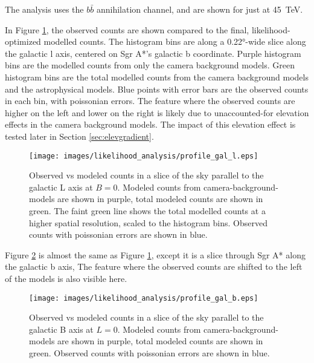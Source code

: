   The analysis uses the $b\bar{b}$ annihilation channel, and are shown for just at \SI{45}{TeV}.

  In Figure \ref{fig:gc_profile_gal_l}, the observed counts are shown compared to the final, likelihood-optimized modelled counts.
  The histogram bins are along a \ang{0.22}-wide slice along the galactic l axis, centered on Sgr A*'s galactic b coordinate.
  Purple histogram bins are the modelled counts from only the camera background models.
  Green histogram bins are the total modelled counts from the camera background models and the astrophysical models.
  Blue points with error bars are the observed counts in each bin, with poissonian errors.
  The feature where the observed counts are higher on the left and lower on the right is likely due to unaccounted-for elevation effects in the camera background models.
  The impact of this elevation effect is tested later in Section \ref{sec:elevgradient}.
  
  \begin{figure}[h]
    \centering
    \texttt{[image: images/likelihood\_analysis/profile\_gal\_l.eps]}
    \caption[Galactic Center Profile vs Galactic L]{
      Observed vs modeled counts in a slice of the sky parallel to the galactic L axis at $B=0$.
      Modeled counts from camera-background-models are shown in purple, total modeled counts are shown in green.
      The faint green line shows the total modelled counts at a higher spatial resolution, scaled to the histogram bins.
      Observed counts with poissonian errors are shown in blue.
    }
    \label{fig:gc_profile_gal_l}
  \end{figure}

  Figure \ref{fig:gc_profile_gal_b} is almost the same as Figure \ref{fig:gc_profile_gal_l}, except it is a slice through Sgr A* along the galactic b axis,
  The feature where the observed counts are shifted to the left of the models is also visible here.

  \begin{figure}[h]
    \centering
    \texttt{[image: images/likelihood\_analysis/profile\_gal\_b.eps]}
    \caption[Galactic Center Profile vs Galactic B]{
      Observed vs modeled counts in a slice of the sky parallel to the galactic B axis at $L=0$.
      Modeled counts from camera-background-models are shown in purple, total modeled counts are shown in green.
      Observed counts with poissonian errors are shown in blue.
    }
    \label{fig:gc_profile_gal_b}
  \end{figure}

